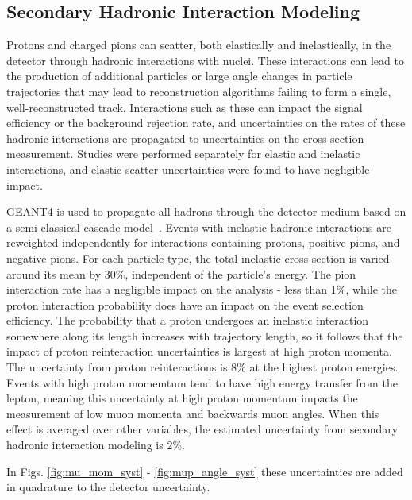 \subsection{Secondary Hadronic Interaction Modeling}
\label{sect:syst_had_int}
Protons and charged pions can scatter, both elastically and inelastically, in the detector through hadronic interactions with nuclei. These interactions can lead to the production of additional particles or large angle changes in particle trajectories that may lead to reconstruction algorithms failing to form a single, well-reconstructed track.
Interactions such as these can impact the signal efficiency or the background rejection rate, and uncertainties on the rates of these hadronic interactions are propagated to uncertainties on the cross-section measurement. Studies were performed separately for elastic and inelastic interactions, and elastic-scatter uncertainties were found to have negligible impact.

GEANT4 is used to propagate all hadrons through the detector medium based on a semi-classical cascade model~\cite{Wright:2015xia}.  Events with inelastic hadronic interactions are reweighted independently for interactions containing protons, positive pions, and negative pions. For each particle type, the total inelastic cross section is varied around its mean by 30\%, independent of the particle's energy. The pion interaction rate has a negligible impact on the analysis - less than 1\%, while the proton interaction probability does have an impact on the event selection efficiency.
The probability that a proton undergoes an inelastic interaction somewhere along its length increases with trajectory length, so it follows that the impact of proton reinteraction uncertainties is largest at high proton momenta. The uncertainty from proton reinteractions is 8\% at the highest proton energies. 
Events with high proton momemtum tend to have high energy transfer from the lepton, meaning this uncertainty at high proton momentum impacts the measurement of low muon momenta and backwards muon angles.
When this effect is averaged over other variables, the estimated uncertainty from secondary hadronic interaction modeling is 2\%.

In Figs. \ref{fig:mu_mom_syst} - \ref{fig:mup_angle_syst} these uncertainties are added in quadrature to the detector uncertainty.
